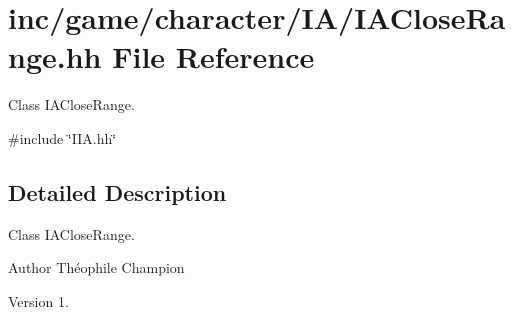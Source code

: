 \hypertarget{IACloseRange_8hh}{}\section{inc/game/character/\+I\+A/\+I\+A\+Close\+Range.hh File Reference}
\label{IACloseRange_8hh}


Class I\+A\+Close\+Range.  


{\ttfamily \#include \char`\"{}I\+I\+A.\+hh\char`\"{}}\newline


\subsection{Detailed Description}
Class I\+A\+Close\+Range. 

\begin{DoxyAuthor}{Author}
Théophile Champion 
\end{DoxyAuthor}
\begin{DoxyVersion}{Version}
1. 
\end{DoxyVersion}
